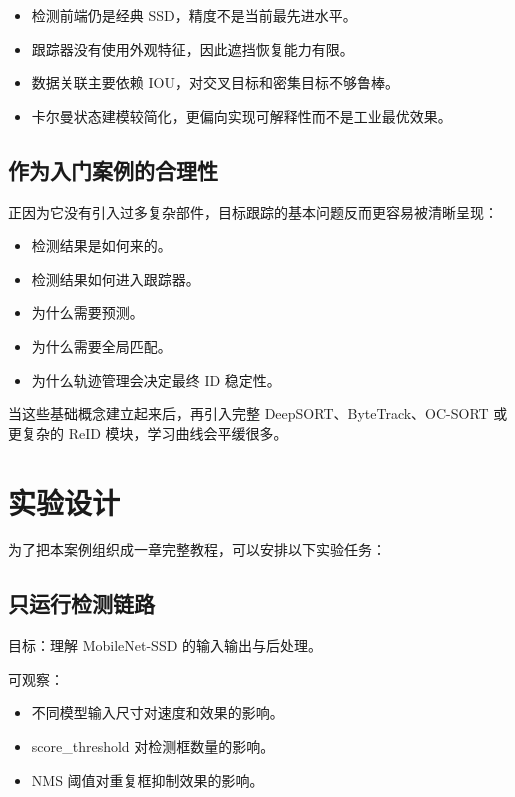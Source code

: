 \begin{itemize}
\tightlist
\item
  检测前端仍是经典 SSD，精度不是当前最先进水平。
\item
  跟踪器没有使用外观特征，因此遮挡恢复能力有限。
\item
  数据关联主要依赖 IOU，对交叉目标和密集目标不够鲁棒。
\item
  卡尔曼状态建模较简化，更偏向实现可解释性而不是工业最优效果。
\end{itemize}

\subsection{作为入门案例的合理性}\label{src-experiment-case2-h61}

正因为它没有引入过多复杂部件，目标跟踪的基本问题反而更容易被清晰呈现：

\begin{itemize}
\tightlist
\item
  检测结果是如何来的。
\item
  检测结果如何进入跟踪器。
\item
  为什么需要预测。
\item
  为什么需要全局匹配。
\item
  为什么轨迹管理会决定最终 ID 稳定性。
\end{itemize}

当这些基础概念建立起来后，再引入完整 DeepSORT、ByteTrack、OC-SORT
或更复杂的 ReID 模块，学习曲线会平缓很多。

\section{实验设计}\label{src-experiment-case2-h62}

为了把本案例组织成一章完整教程，可以安排以下实验任务：

\subsection{只运行检测链路}\label{src-experiment-case2-h63}

目标：理解 MobileNet-SSD 的输入输出与后处理。

可观察：

\begin{itemize}
\tightlist
\item
  不同模型输入尺寸对速度和效果的影响。
\item
  score\_threshold 对检测框数量的影响。
\item
  NMS 阈值对重复框抑制效果的影响。
\end{itemize}


